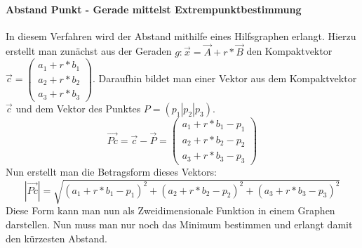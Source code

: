 \documentclass{article}
\begin{document}
\paragraph{Abstand Punkt - Gerade mittelst Extrempunktbestimmung}
In diesem Verfahren wird der Abstand mithilfe eines Hilfsgraphen erlangt. Hierzu erstellt man zunächst aus der Geraden $g : \vec{x} = \vec{A} + r * \vec{B}$ den Kompaktvektor $\vec{c} = \begin{pmatrix} a_1 + r * b_1 \\ a_2 + r * b_2 \\ a_3 + r * b_3 \end{pmatrix}$. Daraufhin bildet man einer Vektor aus dem Kompaktvektor $\vec{c}$ und dem Vektor des Punktes $P = (p_1 | p_2 | p_3)$.
\begin{equation}
\vec{Pc} = \vec{c} - \vec{P} = \begin{pmatrix} a_1 + r * b_1 - p_1 \\ a_2 + r * b_2 - p_2 \\ a_3 + r * b_3 - p_3 \end{pmatrix}
\end{equation}
Nun erstellt man die Betragsform dieses Vektors:
\begin{equation}
| \vec{Pc} | = \sqrt{(a_1 + r * b_1 - p_1)^2 + (a_2 + r * b_2 - p_2)^2 + (a_3 + r * b_3 - p_3)^2}
\end{equation}
Diese Form kann man nun als Zweidimensionale Funktion in einem Graphen darstellen. Nun muss man nur noch das Minimum bestimmen und erlangt damit den kürzesten Abstand.
\end{document}
